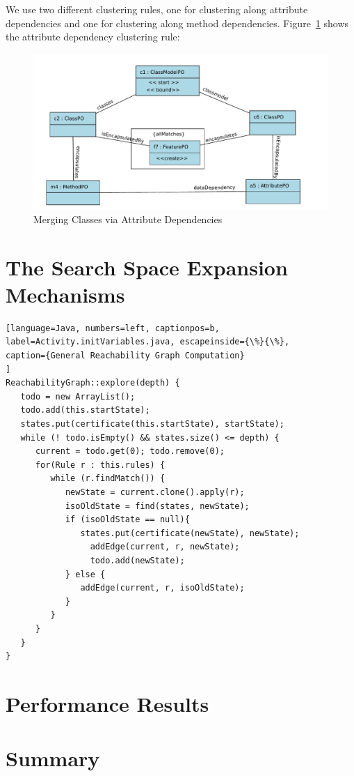 \documentclass[submission,copyright,creativecommons]{eptcs}
\begin{document}
We use two different clustering rules, one for clustering along attribute dependencies 
and one for clustering along method dependencies. Figure~\ref{fig:MergeAttributeRule} 
shows the attribute dependency clustering rule: 

\begin{figure}[ht] \centering
	\includegraphics[width=\linewidth]{images/RuleMergeDataDep.pdf}
 \caption{Merging Classes via Attribute Dependencies}
 \label{fig:MergeAttributeRule}
\end{figure}  


\section{The Search Space Expansion Mechanisms}
\label{sec:expansion}

 


\begin{lstlisting}[language=Java, numbers=left, captionpos=b, 
label=Activity.initVariables.java, escapeinside={\%}{\%},
caption={General Reachability Graph Computation}
]
ReachabilityGraph::explore(depth) {
   todo = new ArrayList();
   todo.add(this.startState);
   states.put(certificate(this.startState), startState);
   while (! todo.isEmpty() && states.size() <= depth) {
      current = todo.get(0); todo.remove(0);
      for(Rule r : this.rules) {
         while (r.findMatch()) {
            newState = current.clone().apply(r);
            isoOldState = find(states, newState);
            if (isoOldState == null){
               states.put(certificate(newState), newState);
            	 addEdge(current, r, newState);
             	 todo.add(newState);
            } else {
               addEdge(current, r, isoOldState);
            }
         }
      }
   }
}

\end{lstlisting}


\section{Performance Results}
\label{sec:results}



\section{Summary}
\label{sec:summary}

 


  
\end{document}
